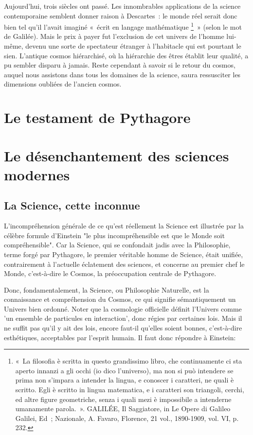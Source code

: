 \documentclass[a4paper,12pt]{article}
\begin{document}
Aujourd'hui, trois siècles ont passé. Les innombrables applications de la science contemporaine semblent donner raison à Descartes : le monde réel serait donc bien tel qu'il l'avait imaginé « écrit en langage mathématique \footnote{« La filosofia è scritta in questo grandissimo libro, che continuamente ci sta aperto innanzi a gli occhi (io dico l’universo), ma non si può intendere se prima non s’impara a intender la lingua, e conoscer i caratteri, ne quali è scritto. Egli è scritto in lingua matematica, e i caratteri son triangoli, cerchi, ed altre figure geometriche, senza i quali mezi è impossibile a intenderne umanamente parola. ». GALILÉE, Il Saggiatore, in Le Opere di Galileo Galilei, Ed ; Nazionale, A. Favaro, Florence, 21 vol., 1890-1909, vol. VI, p. 232.} » (selon le mot de Galilée). Mais le prix à payer fut l'exclusion de cet univers de l'homme lui-même, devenu une sorte de spectateur étranger à l'habitacle qui est pourtant le sien. L'antique cosmos hiérarchisé, où la hiérarchie des êtres établit leur qualité, a pu sembler disparu à jamais. Reste cependant à savoir si le retour du cosmos, auquel nous assistons dans tous les domaines de la science, saura ressusciter les dimensions oubliées de l'ancien cosmos.

\section{Le testament de Pythagore}



\section{Le désenchantement des sciences modernes}


\subsection{La Science, cette inconnue}

L'incompréhension générale de ce qu'est réellement la Science est illustrée par la célèbre formule d'Einstein "le plus incompréhensible est que le Monde soit compréhensible". Car la Science, qui se confondait jadis avec la Philosophie, terme forgé par Pythagore, le premier véritable homme de Science,  était unifiée, contrairement à l'actuelle éclatement des sciences, et concerne au premier chef le Monde, c'est-à-dire le Cosmos, la préoccupation centrale de Pythagore.

Donc, fondamentalement, la Science, ou Philosophie Naturelle, est la connaissance et compréhension du Cosmos, ce qui signifie sémantiquement un Univers bien ordonné. Noter que la cosmologie officielle définit l'Univers comme 'un ensemble de particules en interaction', donc régies par certaines lois. Mais il ne suffit pas qu'il y ait des lois, encore faut-il qu'elles soient bonnes, c'est-à-dire esthétiques,  acceptables par l'esprit humain. Il faut donc répondre à Einstein:
\end{document}
